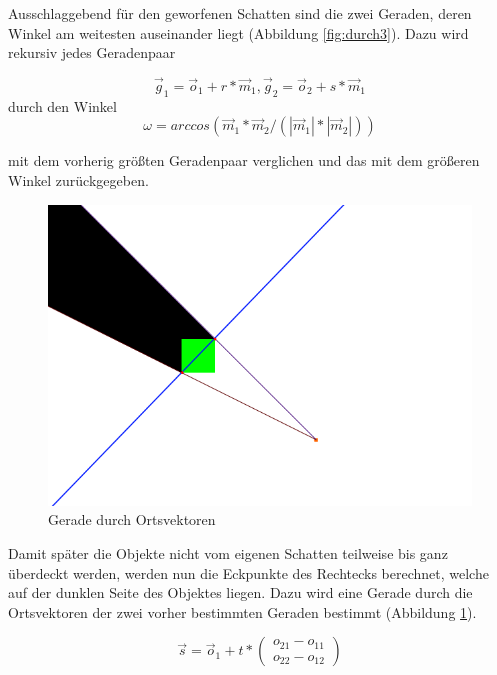 \documentclass[10pt,twocolumn]{scrartcl}
\begin{document}
Ausschlaggebend für den geworfenen Schatten sind die zwei Geraden, deren Winkel am weitesten auseinander liegt (Abbildung \ref{fig:durch3}). Dazu wird rekursiv jedes Geradenpaar 

\begin{equation}
	\vec{g}_1 = \vec{o}_1 + r * \vec{m}_1, \vec{g}_2 = \vec{o}_2 + s * \vec{m}_1
\end{equation}
durch den Winkel
\begin{equation}
	\omega = arccos(\vec{m}_1 * \vec{m}_2 / (|\vec{m}_1| * |\vec{m}_2|))
\end{equation}

mit dem vorherig größten Geradenpaar verglichen und das mit dem größeren Winkel zurückgegeben.

\begin{figure}[t]
	\centering
	\includegraphics[width=\columnwidth]{images/durchfuehrung_2.png}
	\caption{Gerade durch Ortsvektoren}
	\label{fig:durch4}
\end{figure}

Damit später die Objekte nicht vom eigenen Schatten teilweise bis ganz überdeckt werden, werden nun die Eckpunkte des Rechtecks berechnet, welche auf der dunklen Seite des Objektes liegen. Dazu wird eine Gerade durch die Ortsvektoren der zwei vorher bestimmten Geraden bestimmt (Abbildung \ref{fig:durch4}).

\begin{equation}
	\vec{s} = \vec{o}_1 + t * \left(\begin{array}{c} o_21 - o_11 \\ o_22 - o_12 \end{array}\right)
\end{equation}
\end{document}
